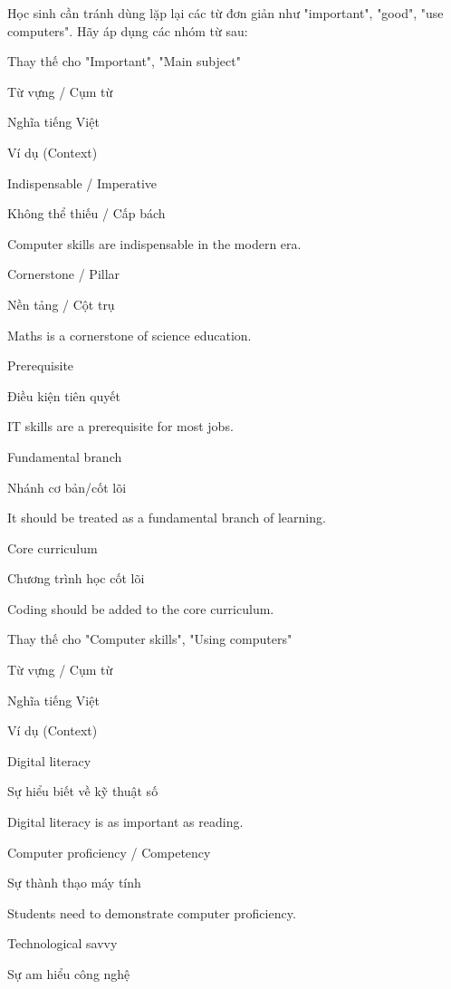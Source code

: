 \documentclass{../templateWriting/cdwriting}
\begin{document}

Học sinh cần tránh dùng lặp lại các từ đơn giản như "important", "good", "use computers". Hãy áp dụng các nhóm từ sau:


Thay thế cho "Important", "Main subject"

Từ vựng / Cụm từ

Nghĩa tiếng Việt

Ví dụ (Context)

Indispensable / Imperative

Không thể thiếu / Cấp bách

Computer skills are indispensable in the modern era.

Cornerstone / Pillar

Nền tảng / Cột trụ

Maths is a cornerstone of science education.

Prerequisite

Điều kiện tiên quyết

IT skills are a prerequisite for most jobs.

Fundamental branch

Nhánh cơ bản/cốt lõi

It should be treated as a fundamental branch of learning.

Core curriculum

Chương trình học cốt lõi

Coding should be added to the core curriculum.


Thay thế cho "Computer skills", "Using computers"

Từ vựng / Cụm từ

Nghĩa tiếng Việt

Ví dụ (Context)

Digital literacy

Sự hiểu biết về kỹ thuật số

Digital literacy is as important as reading.

Computer proficiency / Competency

Sự thành thạo máy tính

Students need to demonstrate computer proficiency.

Technological savvy

Sự am hiểu công nghệ
\end{document}
